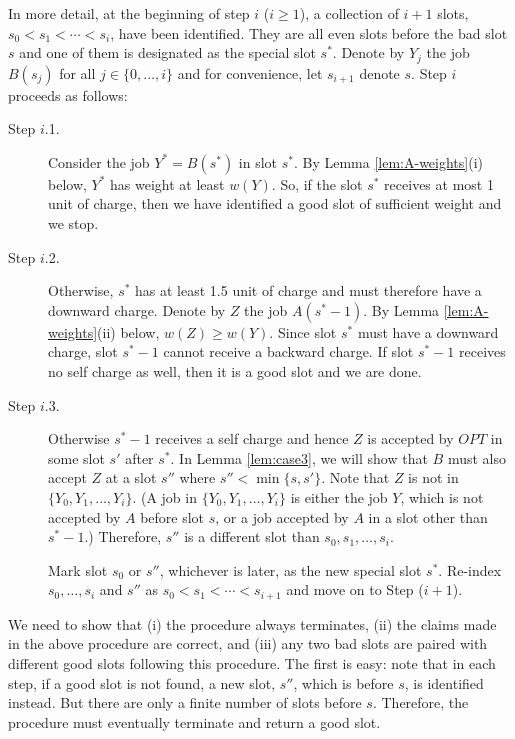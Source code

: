 \documentclass[11pt]{article}
\begin{document}
In more detail, at the beginning of step $i$ ($i \geq 1$),
a collection of $i+1$ slots, $s_0 < s_1 < \cdots < s_i$,
have been identified.
They are all even slots before the bad slot $s$ and
one of them is designated as the special slot $s^*$.
Denote by $Y_j$ the job $B(s_j)$ for all
$j \in \{0, \ldots, i\}$ and for convenience, let
$s_{i+1}$ denote $s$.
Step $i$ proceeds as follows:
\begin{description}
\item[{\rm Step $i$.1.}] 
Consider the job $Y^* = B(s^*)$ in slot $s^*$.
By Lemma \ref{lem:A-weights}(i) below,
$Y^*$ has weight at least $w(Y)$.
So, if the slot $s^*$ receives at most 1 unit of charge,
then we have identified a good slot of sufficient weight
and we stop.

\item[{\rm Step $i$.2.}] 
Otherwise, $s^*$ has at least 1.5 unit of charge
and must therefore have a downward charge.
Denote by $Z$ the job $A(s^*-1)$.
By Lemma \ref{lem:A-weights}(ii) below, $w(Z) \geq w(Y)$.
Since slot $s^*$ must have a downward charge,
slot $s^*-1$ cannot receive a backward charge.
If slot $s^*-1$ receives no self charge as well, 
then it is a good slot and we are done.  

\item[{\rm Step $i$.3.}]
Otherwise $s^*-1$ receives a self charge and hence $Z$ is
accepted by $OPT$ in some slot $s'$ after $s^*$.
In Lemma \ref{lem:case3}, we will show that $B$ must also
accept $Z$ at a slot $s''$ where $s'' < \min\{s, s'\}$.
Note that $Z$ is not in $\{ Y_0, Y_1, \ldots, Y_i \}$.
(A job in  $\{ Y_0, Y_1, \ldots, Y_i \}$ is either the
job $Y$, which is not accepted by $A$ before slot $s$,
or a job accepted by $A$ in a slot other than
$s^*-1$.)
Therefore, $s''$ is a different slot than 
$s_0, s_1, \ldots, s_i$.

Mark slot $s_0$ or $s''$, whichever is later,
as the new special slot $s^*$.
Re-index $s_0, \ldots, s_i$ and $s''$
as $s_0 < s_1 < \cdots < s_{i+1}$ and
move on to Step ($i+1$).
\end{description}

We need to show that
(i) the procedure always terminates,
(ii) the claims made in the above procedure are correct, and
(iii) any two bad slots are paired with different good slots
following this procedure.  
The first is easy: note that in each step, 
if a good slot is not found, a new slot, $s''$,
which is before $s$, is identified instead.
But there are only a finite number of slots before $s$. 
Therefore, the procedure must eventually terminate and
return a good slot.
\end{document}
